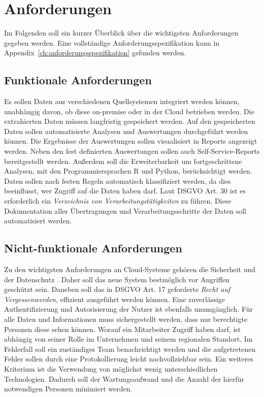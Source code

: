 \section{Anforderungen}
\label{sec:anforderungen}
Im Folgenden soll ein kurzer Überblick über die wichtigsten Anforderungen gegeben werden. Eine vollständige Anforderungsspezifikation kann in Appendix~\ref{ch:anforderungsspezifikation} gefunden werden. 

\subsection{Funktionale Anforderungen}
Es sollen Daten aus verschiedenen Quellsystemen integriert werden können, unabhängig davon, ob diese on-premise oder in der Cloud betrieben werden. Die extrahierten Daten müssen langfristig gespeichert werden. Auf den gespeicherten Daten sollen automatisierte Analysen und Auswertungen durchgeführt werden können. Die Ergebnisse der Auswertungen sollen visualisiert in Reports angezeigt werden. Neben den fest definierten Auswertungen sollen auch Self-Service-Reports bereitgestellt werden. Außerdem soll die Erweiterbarkeit um fortgeschrittene Analysen, mit den Programmiersprachen R und Python, berücksichtigt werden. Daten sollen nach festen Regeln automatisch klassifiziert werden, da dies beeinflusst, wer Zugriff auf die Daten haben darf. Laut DSGVO Art. 30 ist es erforderlich ein \textit{Verzeichnis von Verarbeitungstätigkeiten} zu führen. Diese Dokumentation aller Übertragungen und Verarbeitungsschritte der Daten soll automatisiert werden. 

\subsection{Nicht-funktionale Anforderungen}
Zu den wichtigsten Anforderungen an Cloud-Systeme gehören die Sicherheit und der Datenschutz \cite{gurjar_cloud_2013}. Daher soll das neue System bestmöglich vor Angriffen geschützt sein. Daneben soll das in DSGVO Art. 17 geforderte \textit{Recht auf Vergessenwerden}, effizient ausgeführt werden können. Eine zuverlässige Authentifizierung und Autorisierung der Nutzer ist ebenfalls unumgänglich. Für alle Daten und Informationen muss sichergestellt werden, dass nur berechtigte Personen diese sehen können. Worauf ein Mitarbeiter Zugriff haben darf, ist abhängig von seiner Rolle im Unternehmen und seinem regionalen Standort. Im Fehlerfall soll ein zuständiges Team benachrichtigt werden und die aufgetretenen Fehler sollen durch eine Protokollierung leicht nachvollziehbar sein. Ein weiteres Kriterium ist die Verwendung von möglichst wenig unterschiedlichen Technologien. Dadurch soll der Wartungsaufwand und die Anzahl der hierfür notwendigen Personen minimiert werden.